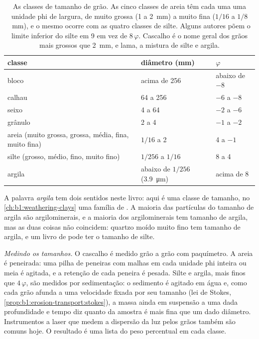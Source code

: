 \begin{table}[htbp]
\centering\small
\begin{tabular}{@{}lll@{}}
\hline
classe & diâmetro (\si{mm}) & $\varphi$ \\
\hline
bloco & acima de 256 & abaixo de $-8$ \\
calhau & 64 a 256 & $-6$ a $-8$ \\
seixo & 4 a 64 & $-2$ a $-6$ \\
grânulo & 2 a 4 & $-1$ a $-2$ \\
areia (muito grossa, grossa, média, fina, muito fina) & $1/16$ a 2 & 4 a $-1$ \\
silte (grosso, médio, fino, muito fino) & $1/256$ a $1/16$ & 8 a 4 \\
argila & abaixo de $1/256$ (\qty{3.9}{\micro m}) & acima de 8 \\
\hline
\end{tabular}
\caption{As classes de tamanho de grão. As cinco classes de areia têm cada uma uma unidade phi de largura, de muito grossa (1 a \qty{2}{mm}) a muito fina ($1/16$ a
$1/8$~mm), e o mesmo ocorre com as quatro classes de silte. Alguns autores põem o limite inferior do silte em 9 em vez de $8\,\varphi$. Cascalho é o nome geral dos grãos mais grossos que \qty{2}{mm}, e lama, a mistura de silte e argila.}
\label{tab:b1:clastic-sediments:classes}
\end{table}

A palavra \emph{argila} tem dois sentidos neste livro: aqui é uma classe de tamanho, no \cref{ch:b1:weathering-clays} uma família de . A maioria das partículas do tamanho de argila são argilominerais, e a maioria dos argilominerais tem tamanho de argila, mas as duas coisas não coincidem: quartzo moído muito fino tem tamanho de argila, e um livro de  pode ter o tamanho de silte.

\emph{Medindo os tamanhos.} O cascalho é medido grão a grão com paquímetro. A areia é peneirada: uma pilha de peneiras com malhas em cada unidade phi inteira ou meia é agitada, e a retenção de cada peneira é pesada. Silte e argila, mais finos que $4\,\varphi$, são medidos por sedimentação: o sedimento é agitado em água e, como cada grão afunda a uma velocidade fixada por seu tamanho (lei de Stokes, \cref{prop:b1:erosion-transport:stokes}), a massa ainda em suspensão a uma dada profundidade e tempo diz quanto da amostra é mais fina que um dado diâmetro. Instrumentos a laser que medem a dispersão da luz pelos grãos também são comuns hoje. O resultado é uma lista do peso percentual em cada classe.

